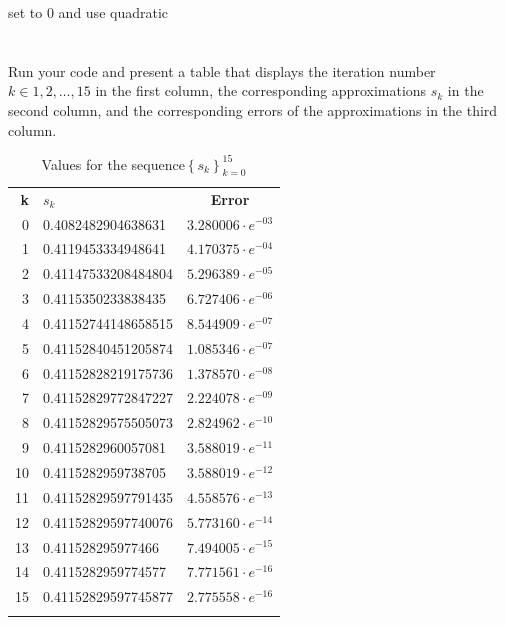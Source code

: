 \documentclass{article}
\begin{document}
set to 0 and use quadratic

\section{}
Run your code and present a table that displays the iteration number $k \in {1,2,\dots,15}$ in the first column, the corresponding approximations $s_k$ in the second column, and the corresponding errors of the approximations in the third column.
\vspace{10mm}

\begin{table}[H]
    \centering
    \begin{tabular}{|r|l|c|}
        \Xhline{1 pt}
         \centering \textbf{k}& \textbf{$s_k$}& \textbf{Error}  \\
         \Xhline{1.5 pt}
         0 & 0.4082482904638631&$3.280006\cdot e^{-03}$\\
         \Xhline{1 pt}
         1 & 0.4119453334948641&$4.170375\cdot e^{-04}$\\
         \Xhline{1 pt}
         2 & 0.41147533208484804&$5.296389\cdot e^{-05}$\\
         \Xhline{1 pt}
         3 & 0.4115350233838435&$6.727406\cdot e^{-06}$\\
         \Xhline{1 pt}
         4 & 0.41152744148658515 &$8.544909\cdot e^{-07}$\\
         \Xhline{1 pt}
         5 & 0.41152840451205874 & $1.085346\cdot e^{-07}$\\
          \Xhline{1 pt}
         6 & 0.41152828219175736 & $1.378570\cdot e^{-08}$\\
          \Xhline{1 pt}
         7 & 0.41152829772847227 &$2.224078\cdot e^{-09}$\\
          \Xhline{1 pt}
         8 & 0.41152829575505073 &$2.824962\cdot e^{-10}$\\
          \Xhline{1 pt}
         9 & 0.4115282960057081 &$3.588019\cdot e^{-11}$\\
          \Xhline{1 pt}
         10 & 0.4115282959738705 &$3.588019\cdot e^{-12}$\\
          \Xhline{1 pt}
         11 & 0.41152829597791435 &$4.558576\cdot e^{-13}$\\
          \Xhline{1 pt}
         12 & 0.41152829597740076 &$5.773160\cdot e^{-14}$\\
          \Xhline{1 pt}
         13 & 0.411528295977466 &$7.494005\cdot e^{-15}$\\
          \Xhline{1 pt}
         14 & 0.4115282959774577&$7.771561\cdot e^{-16}$\\
          \Xhline{1 pt}
         15 & 0.41152829597745877&$2.775558\cdot e^{-16}$\\
         \Xhline{1 pt}
    \end{tabular}
    \caption{Values for the sequence$\left\{ s_k\right\}_{k=0}^{15}$}
    \label{tab:15sequence}
\end{table}
\end{document}
